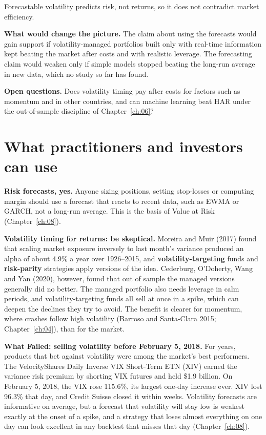 Forecastable volatility predicts risk, not returns, so it does not contradict market efficiency.

\textbf{What would change the picture.} The claim about using the forecasts would gain support if volatility-managed portfolios built only with real-time information kept beating the market after costs and with realistic leverage. The forecasting claim would weaken only if simple models stopped beating the long-run average in new data, which no study so far has found.

\label{sec:10-open}
\textbf{Open questions.} Does volatility timing pay after costs for factors such as momentum and in other countries, and can machine learning beat HAR under the out-of-sample discipline of Chapter~\ref{ch:06}?

\section{What practitioners and investors can use}
\label{sec:10-investors}

\textbf{Risk forecasts, yes.} Anyone sizing positions, setting stop-losses or computing margin should use a forecast that reacts to recent data, such as EWMA or GARCH, not a long-run average. This is the basis of Value at Risk (Chapter~\ref{ch:08}).

\textbf{Volatility timing for returns: be skeptical.} Moreira and Muir (2017) found that scaling market exposure inversely to last month's variance produced an alpha of about 4.9\% a year over 1926--2015, and \textbf{volatility-targeting} funds and \textbf{risk-parity} strategies apply versions of the idea. Cederburg, O'Doherty, Wang and Yan (2020), however, found that out of sample the managed versions generally did no better. The managed portfolio also needs leverage in calm periods, and volatility-targeting funds all sell at once in a spike, which can deepen the declines they try to avoid. The benefit is clearer for momentum, where crashes follow high volatility (Barroso and Santa-Clara 2015; Chapter~\ref{ch:04}), than for the market.

\begin{callout}
\textbf{What Failed: selling volatility before February 5, 2018.} For years, products that bet against volatility were among the market's best performers. The VelocityShares Daily Inverse VIX Short-Term ETN (XIV) earned the variance risk premium by shorting VIX futures and held \$1.9 billion. On February 5, 2018, the VIX rose 115.6\%, its largest one-day increase ever. XIV lost 96.3\% that day, and Credit Suisse closed it within weeks. Volatility forecasts are informative on average, but a forecast that volatility will stay low is weakest exactly at the onset of a spike, and a strategy that loses almost everything on one day can look excellent in any backtest that misses that day (Chapter~\ref{ch:08}).
\end{callout}

